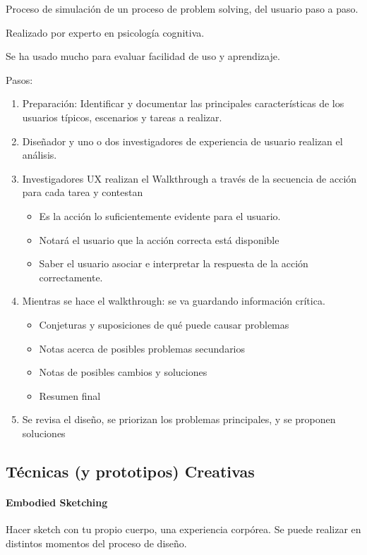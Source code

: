\documentclass[12pt, twoside, openright]{report} %
\begin{document}
\begin{itemize}
	      Proceso de simulación de un proceso de problem solving, del usuario paso a paso.

	      Realizado por experto en psicología cognitiva.

	      Se ha usado mucho para evaluar facilidad de uso y aprendizaje.

	      Pasos:
	      \begin{enumerate}
		      \item Preparación: Identificar y documentar las principales características de los usuarios típicos, escenarios y tareas a realizar.
		      \item Diseñador y uno o dos investigadores de experiencia de usuario realizan el análisis.
		      \item Investigadores UX realizan el Walkthrough a través de la secuencia de acción para cada tarea y contestan
		            \begin{itemize}
			            \item Es la acción lo suficientemente evidente para el usuario.
			            \item Notará el usuario que la acción correcta está disponible
			            \item Saber el usuario asociar e interpretar la respuesta de la acción correctamente.
		            \end{itemize}
		      \item Mientras se hace el walkthrough: se va guardando información crítica.
		            \begin{itemize}
			            \item Conjeturas y suposiciones de qué puede causar problemas
			            \item Notas acerca de posibles problemas secundarios
			            \item Notas de posibles cambios y soluciones
			            \item Resumen final
		            \end{itemize}
		      \item Se revisa el diseño, se priorizan los problemas principales, y se
		            proponen soluciones
	      \end{enumerate}
\end{itemize}

\subsection{Técnicas (y prototipos) Creativas}
\paragraph{Embodied Sketching}
Hacer sketch con tu propio cuerpo, una experiencia corpórea. Se puede realizar en distintos momentos del proceso de diseño.
\end{document}
